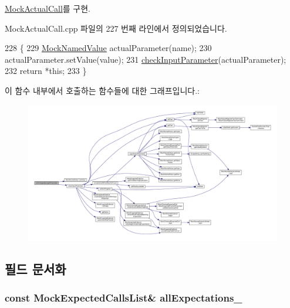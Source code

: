 \hyperlink{class_mock_actual_call_ab11fb46b42771e1421ce02b8e1851b9f}{Mock\+Actual\+Call}를 구현.



Mock\+Actual\+Call.\+cpp 파일의 227 번째 라인에서 정의되었습니다.


\begin{DoxyCode}
228 \{
229     \hyperlink{class_mock_named_value}{MockNamedValue} actualParameter(name);
230     actualParameter.setValue(value);
231     \hyperlink{class_mock_checked_actual_call_a43315549d2e79952b76f087c3b9722cf}{checkInputParameter}(actualParameter);
232     \textcolor{keywordflow}{return} *\textcolor{keyword}{this};
233 \}
\end{DoxyCode}


이 함수 내부에서 호출하는 함수들에 대한 그래프입니다.\+:
\nopagebreak
\begin{figure}[H]
\begin{center}
\leavevmode
\includegraphics[width=350pt]{class_mock_checked_actual_call_a6cbc626f3ed2fde276f312b1bef0a2d4_cgraph}
\end{center}
\end{figure}




\subsection{필드 문서화}
\subsubsection[{\texorpdfstring{all\+Expectations\+\_\+}{allExpectations_}}]{\setlength{\rightskip}{0pt plus 5cm}const {\bf Mock\+Expected\+Calls\+List}\& all\+Expectations\+\_\+\hspace{0.3cm}{\ttfamily [private]}}\hypertarget{class_mock_checked_actual_call_aed217603c4a32c8f55a3087ac4a64a78}{}\label{class_mock_checked_actual_call_aed217603c4a32c8f55a3087ac4a64a78}


